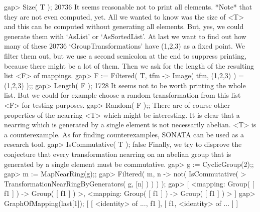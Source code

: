 \beginexample
    gap> Size( T );
    20736
\endexample
        It seems reasonable not to print all elements. *Note* that they are
        not even computed, yet. All we wanted to know was the size of <T> and
        this can be computed without generating all elements. But, yes, we
        could generate them with `AsList' or `AsSortedList'. At last we want
        to find out how many of these 20736 `GroupTransformations' have (1,2,3)
        as a fixed point. We filter them out, but we use a second semicolon at
        the end to suppress printing, because there might be a lot of them.
        Then we ask for the length of the resulting list <F> of mappings.
\beginexample
    gap> F := Filtered( T, tfm -> Image( tfm, (1,2,3) ) = (1,2,3) );;
    gap> Length( F );
    1728
\endexample
        It seems not to be worth printing the whole list. But we could for
        example choose a random transformation from this list <F> for testing
        purposes.
\beginexample
    gap> Random( F );;
\endexample
        There are of course other properties of the nearring <T>
        which might be interesting. It is clear that a nearring which is
        generated by a single element is not necessarily abelian. <T> is a
        counterexample. As for finding counterexamples, SONATA can be used
        as a research tool.
\beginexample
    gap> IsCommutative( T );
    false
\endexample
        Finally, we try to disprove the conjecture that every transformation
        nearring on an abelian group that is generated by a single element 
        must be commutative.
\beginexample
    gap> g := CyclicGroup(2);;
    gap> m := MapNearRing(g);;
    gap> Filtered( m, n -> not( IsCommutative(                                            
    >        TransformationNearRingByGenerators( g, [n] ) ) ) );
    gap> [ <mapping: Group( [ f1 ] ) -> Group( [ f1 ] ) >, 
           <mapping: Group( [ f1 ] ) -> Group( [ f1 ] ) > ]
    gap> GraphOfMapping(last[1]);
    [ [ <identity> of ..., f1 ], [ f1, <identity> of ... ] ]
\endexample

